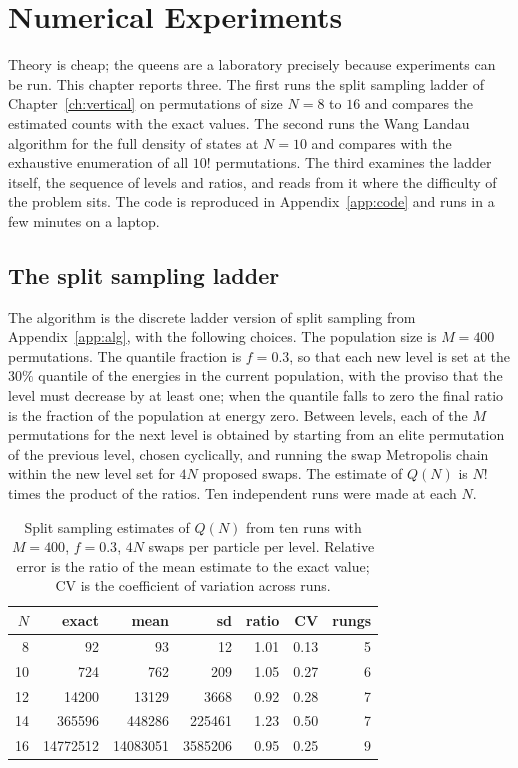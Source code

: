 \chapter{Numerical Experiments}
\label{ch:experiments}

Theory is cheap; the queens are a laboratory precisely because experiments can be run. This chapter reports three. The first runs the split sampling ladder of Chapter~\ref{ch:vertical} on permutations of size $N = 8$ to $16$ and compares the estimated counts with the exact values. The second runs the Wang Landau algorithm for the full density of states at $N = 10$ and compares with the exhaustive enumeration of all $10!$ permutations. The third examines the ladder itself, the sequence of levels and ratios, and reads from it where the difficulty of the problem sits. The code is reproduced in Appendix~\ref{app:code} and runs in a few minutes on a laptop.

\section{The split sampling ladder}

The algorithm is the discrete ladder version of split sampling from Appendix~\ref{app:alg}, with the following choices. The population size is $M = 400$ permutations. The quantile fraction is $f = 0.3$, so that each new level is set at the $30\%$ quantile of the energies in the current population, with the proviso that the level must decrease by at least one; when the quantile falls to zero the final ratio is the fraction of the population at energy zero. Between levels, each of the $M$ permutations for the next level is obtained by starting from an elite permutation of the previous level, chosen cyclically, and running the swap Metropolis chain within the new level set for $4N$ proposed swaps. The estimate of $Q(N)$ is $N!$ times the product of the ratios. Ten independent runs were made at each $N$.

\begin{table}[t]
\centering
\small
\caption{Split sampling estimates of $Q(N)$ from ten runs with $M = 400$, $f = 0.3$, $4N$ swaps per particle per level. Relative error is the ratio of the mean estimate to the exact value; CV is the coefficient of variation across runs.}
\label{tab:split}
\begin{tabular}{rrrrrrr}
\toprule
$N$ & exact & mean & sd & ratio & CV & rungs \\
\midrule
8 & 92 & 93 & 12 & 1.01 & 0.13 & 5 \\
10 & 724 & 762 & 209 & 1.05 & 0.27 & 6 \\
12 & 14200 & 13129 & 3668 & 0.92 & 0.28 & 7 \\
14 & 365596 & 448286 & 225461 & 1.23 & 0.50 & 7 \\
16 & 14772512 & 14083051 & 3585206 & 0.95 & 0.25 & 9 \\
\bottomrule
\end{tabular}
\end{table}

